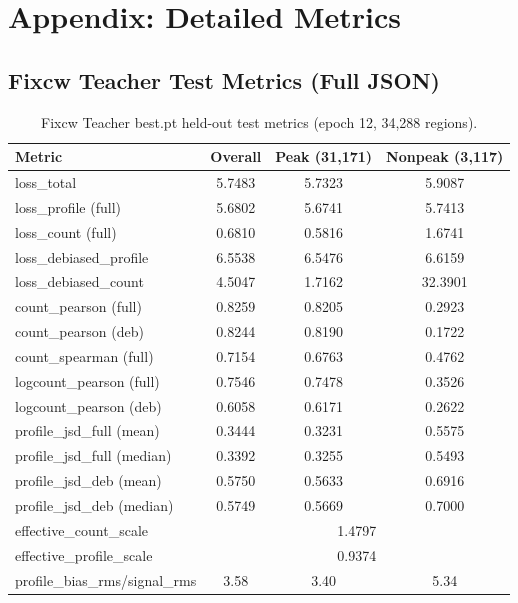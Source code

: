 \documentclass[11pt,a4paper]{article}
\begin{document}
\section{Appendix: Detailed Metrics}
\label{sec:appendix}

\subsection{Fixcw Teacher Test Metrics (Full JSON)}

\begin{table}[h]
\centering
\caption{Fixcw Teacher best.pt held-out test metrics (epoch 12, 34,288 regions).}
\label{tab:fixcw_full}
\small
\begin{tabular}{l c c c}
\toprule
\textbf{Metric} & \textbf{Overall} & \textbf{Peak (31,171)} & \textbf{Nonpeak (3,117)} \\
\midrule
loss\_total & 5.7483 & 5.7323 & 5.9087 \\
loss\_profile (full) & 5.6802 & 5.6741 & 5.7413 \\
loss\_count (full) & 0.6810 & 0.5816 & 1.6741 \\
loss\_debiased\_profile & 6.5538 & 6.5476 & 6.6159 \\
loss\_debiased\_count & 4.5047 & 1.7162 & 32.3901 \\
\midrule
count\_pearson (full) & 0.8259 & 0.8205 & 0.2923 \\
count\_pearson (deb) & 0.8244 & 0.8190 & 0.1722 \\
count\_spearman (full) & 0.7154 & 0.6763 & 0.4762 \\
logcount\_pearson (full) & 0.7546 & 0.7478 & 0.3526 \\
logcount\_pearson (deb) & 0.6058 & 0.6171 & 0.2622 \\
\midrule
profile\_jsd\_full (mean) & 0.3444 & 0.3231 & 0.5575 \\
profile\_jsd\_full (median) & 0.3392 & 0.3255 & 0.5493 \\
profile\_jsd\_deb (mean) & 0.5750 & 0.5633 & 0.6916 \\
profile\_jsd\_deb (median) & 0.5749 & 0.5669 & 0.7000 \\
\midrule
effective\_count\_scale & \multicolumn{3}{c}{1.4797} \\
effective\_profile\_scale & \multicolumn{3}{c}{0.9374} \\
profile\_bias\_rms/signal\_rms & 3.58 & 3.40 & 5.34 \\
\bottomrule
\end{tabular}
\end{table}
\end{document}

